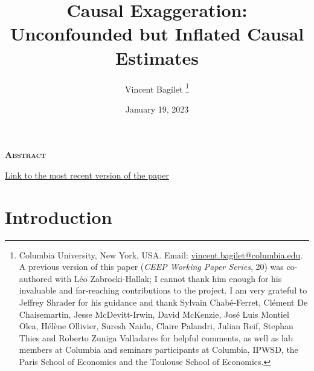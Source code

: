 \documentclass[usletter, 12pt]{article}
\begin{document}

	
	\title{Causal Exaggeration: \\ Unconfounded but Inflated Causal Estimates}

	\author{Vincent Bagilet
		\thanks{Columbia University, New York, USA. Email: \url{vincent.bagilet@columbia.edu}. 
			A previous version of this paper (\textit{CEEP Working Paper Series}, 20) was co-authored with Léo Zabrocki-Hallak; I cannot thank him enough for his invaluable and far-reaching contributions to the project. I am very grateful to Jeffrey Shrader for his guidance and thank Sylvain Chabé-Ferret, Clément De Chaisemartin, Jesse McDevitt-Irwin, David McKenzie, José Luis Montiel Olea, Hélène Ollivier, Suresh Naidu, Claire Palandri, Julian Reif, Stephan Thies and Roberto Zuniga Valladares for helpful comments, as well as lab members at Columbia and seminars participants at Columbia, IPWSD, the Paris School of Economics and the Toulouse School of Economics.}
	}
	

	\date{January 19, 2023}
	
	\maketitle
	
	\begin{center}
		\large \textsc{\textbf{Abstract}}\\
	\end{center}
	
	
		
			
	\begin{center}
		\href{https://github.com/vincentbagilet/causal_exaggeration/blob/main/outputs/current_version/causal_exaggeration_paper.pdf}{Link to the most recent version of the paper}
	\end{center}
	
	
	\newpage
	


	
	\section{Introduction}
	
\end{document}
